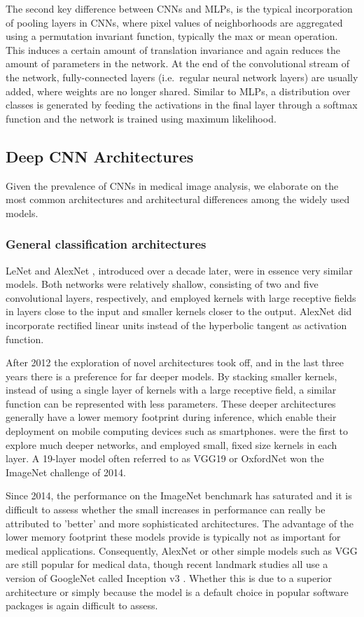 \documentclass[final,a4paper,12pt,english]{UnicaPhdThesis3}
\begin{document}
The second key difference between CNNs and MLPs, is the typical incorporation of pooling layers in CNNs, where pixel values of neighborhoods are aggregated using a permutation invariant function, typically the max or mean operation. This induces a certain amount of translation invariance and again reduces the amount of parameters in the network. At the end of the convolutional stream of the network, fully-connected layers (i.e.\ regular neural network layers) are usually added, where weights are no longer shared. Similar to MLPs, a distribution over classes is generated by feeding the activations in the final layer through a softmax function and the network is trained using maximum likelihood. 

\subsection{Deep CNN Architectures}
Given the prevalence of CNNs in medical image analysis, we elaborate on the most common architectures and architectural differences among the widely used models. 

\subsubsection{General classification architectures}
LeNet \cite{Lecu98} and AlexNet \cite{Kriz12}, introduced over a decade later, were in essence very similar models. Both networks were relatively shallow, consisting of two and five convolutional layers, respectively, and employed kernels with large receptive fields in layers close to the input and smaller kernels closer to the output. AlexNet did incorporate rectified linear units instead of the hyperbolic tangent as activation function.

After 2012 the exploration of novel architectures took off, and in the last three years there is a preference for far deeper models. By stacking smaller kernels, instead of using a single layer of kernels with a large receptive field, a similar function can be represented with less parameters. These deeper architectures generally have a lower memory footprint during inference, which enable their deployment on mobile computing devices such as smartphones. \cite{Simo14} were the first to explore much deeper networks, and employed small, fixed size kernels in each layer. A 19-layer model often referred to as VGG19 or OxfordNet won the ImageNet challenge of 2014. 

Since 2014, the performance on the ImageNet benchmark has saturated and it is difficult to assess whether the small increases in performance can really be attributed to 'better' and more sophisticated architectures. The advantage of the lower memory footprint these models provide is typically not as important for medical applications. Consequently, AlexNet or other simple models such as VGG are still popular for medical data, though recent landmark studies all use a version of GoogleNet called Inception v3 \cite{Guls16}. Whether this is due to a superior architecture or simply because the model is a default choice in popular software packages is again difficult to assess. 
\end{document}
